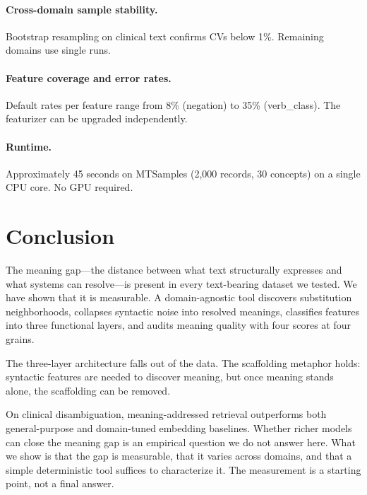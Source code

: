 \documentclass[11pt,a4paper]{article}
\begin{document}
\paragraph{Cross-domain sample stability.} Bootstrap resampling on clinical text confirms CVs below 1\%. Remaining domains use single runs.

\paragraph{Feature coverage and error rates.} Default rates per feature range from 8\% (negation) to 35\% (verb\_class). The featurizer can be upgraded independently.

\paragraph{Runtime.} Approximately 45 seconds on MTSamples (2,000 records, 30 concepts) on a single CPU core. No GPU required.

\section{Conclusion}

The meaning gap---the distance between what text structurally expresses and what systems can resolve---is present in every text-bearing dataset we tested. We have shown that it is measurable. A domain-agnostic tool discovers substitution neighborhoods, collapses syntactic noise into resolved meanings, classifies features into three functional layers, and audits meaning quality with four scores at four grains.

The three-layer architecture falls out of the data. The scaffolding metaphor holds: syntactic features are needed to discover meaning, but once meaning stands alone, the scaffolding can be removed.

On clinical disambiguation, meaning-addressed retrieval outperforms both general-purpose and domain-tuned embedding baselines. Whether richer models can close the meaning gap is an empirical question we do not answer here. What we show is that the gap is measurable, that it varies across domains, and that a simple deterministic tool suffices to characterize it. The measurement is a starting point, not a final answer.
\end{document}
